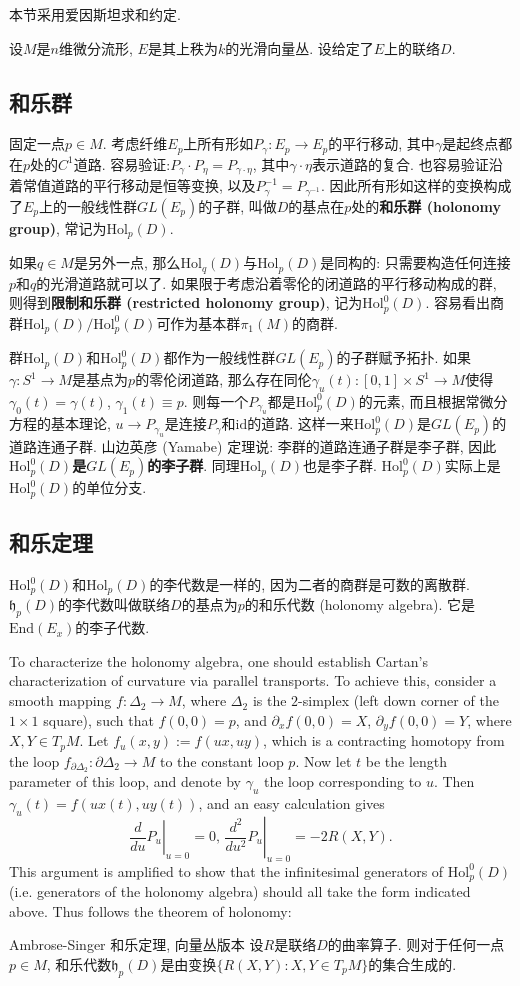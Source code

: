 
本节采用爱因斯坦求和约定.

设$M$是$n$维微分流形, $E$是其上秩为$k$的光滑向量丛. 设给定了$E$上的联络$D$.

\subsection{和乐群}
固定一点$p\in M$. 考虑纤维$E_p$上所有形如$P_\gamma:E_p\to E_p$的平行移动, 其中$\gamma$是起终点都在$p$处的$C^1$道路. 容易验证:$P_\gamma\cdot P_\eta=P_{\gamma\cdot\eta}$,
其中$\gamma\cdot\eta$表示道路的复合. 也容易验证沿着常值道路的平行移动是恒等变换, 以及$P_\gamma^{-1}=P_{\gamma^{-1}}$. 因此所有形如这样的变换构成了$E_p$上的一般线性群$GL(E_p)$的子群, 叫做$D$的基点在$p$处的\textbf{和乐群 (holonomy group)}, 常记为$\text{Hol}_p(D)$. 

如果$q\in M$是另外一点, 那么$\text{Hol}_q(D)$与$\text{Hol}_p(D)$是同构的: 只需要构造任何连接$p$和$q$的光滑道路就可以了. 如果限于考虑沿着零伦的闭道路的平行移动构成的群, 则得到\textbf{限制和乐群 (restricted holonomy group)}, 记为$\text{Hol}^0_p(D)$. 容易看出商群$\text{Hol}_p(D)/\text{Hol}_p^0(D)$可作为基本群$\pi_1(M)$的商群.

群$\text{Hol}_p(D)$和$\text{Hol}_p^0(D)$都作为一般线性群$GL(E_p)$的子群赋予拓扑. 如果$\gamma:S^1\to M$是基点为$p$的零伦闭道路, 那么存在同伦$\gamma_u(t):[0,1]\times S^1\to M$使得$\gamma_0(t)=\gamma(t)$, $\gamma_1(t)\equiv p$. 则每一个$P_{\gamma_u}$都是$\text{Hol}_p^0(D)$的元素, 而且根据常微分方程的基本理论, $u\to P_{\gamma_u}$是连接$P_\gamma$和$\text{id}$的道路. 这样一来$\text{Hol}_p^0(D)$是$GL(E_p)$的道路连通子群. 山边英彦 (Yamabe) 定理说: 李群的道路连通子群是李子群, 因此\textbf{$\text{Hol}_p^0(D)$是$GL(E_p)$的李子群}. 同理$\text{Hol}_p(D)$也是李子群. $\text{Hol}_p^0(D)$实际上是$\text{Hol}_p^0(D)$的单位分支.

\subsection{和乐定理}
$\text{Hol}_p^0(D)$和$\text{Hol}_p(D)$的李代数是一样的, 因为二者的商群是可数的离散群. $\mathfrak{h}_p(D)$的李代数叫做联络$D$的基点为$p$的和乐代数 (holonomy algebra).  它是$\text{End}(E_x)$的李子代数. 

To characterize the holonomy algebra, one should establish Cartan's characterization of curvature via parallel transports. To achieve this, consider a smooth mapping $f:\Delta_2\to M$, where $\Delta_2$ is the $2$-simplex (left down corner of the $1\times1$ square), such that $f(0,0)=p$, and $\partial_xf(0,0)=X$, $\partial_yf(0,0)=Y$, where $X,Y\in T_pM$. Let $f_u(x,y):=f(ux,uy)$, which is a contracting homotopy from the loop $f_{\partial\Delta_2}:\partial\Delta_2\to M$ to the constant loop $p$. Now let $t$ be the length parameter of this loop, and denote by $\gamma_u$ the loop corresponding to $u$. Then $\gamma_u(t)=f(ux(t),uy(t))$, and an easy calculation gives
$$\left.\frac{d}{du}P_u\right|_{u=0}=0,\,\left.\frac{d^2}{du^2}P_u\right|_{u=0}=-2R(X,Y).$$
This argument is amplified to show that the infinitesimal generators of $\text{Hol}_p^0(D)$ (i.e. generators of the holonomy algebra) should all take the form indicated above. Thus follows the theorem of holonomy:

\begin{theorem}{Ambrose-Singer 和乐定理, 向量丛版本}
设$R$是联络$D$的曲率算子. 则对于任何一点$p\in M$, 和乐代数$\mathfrak{h}_p(D)$是由变换$\{R(X,Y):X,Y\in T_pM\}$的集合生成的.
\end{theorem}